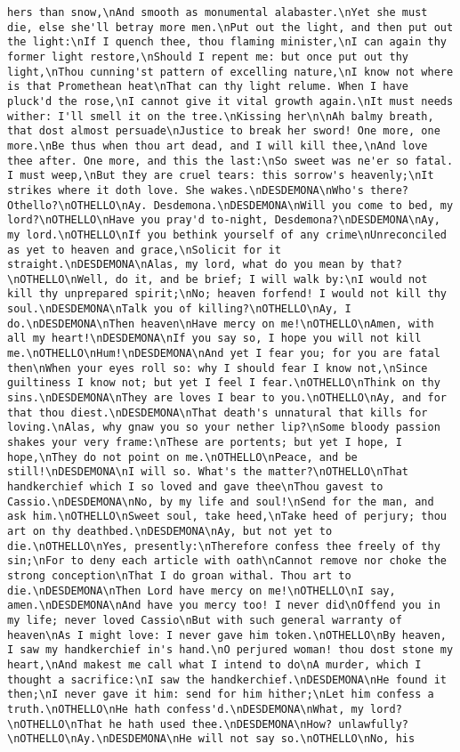 \begin{verbatim}
hers than snow,\nAnd smooth as monumental alabaster.\nYet she must die, else she'll betray more men.\nPut out the light, and then put out the light:\nIf I quench thee, thou flaming minister,\nI can again thy former light restore,\nShould I repent me: but once put out thy light,\nThou cunning'st pattern of excelling nature,\nI know not where is that Promethean heat\nThat can thy light relume. When I have pluck'd the rose,\nI cannot give it vital growth again.\nIt must needs wither: I'll smell it on the tree.\nKissing her\n\nAh balmy breath, that dost almost persuade\nJustice to break her sword! One more, one more.\nBe thus when thou art dead, and I will kill thee,\nAnd love thee after. One more, and this the last:\nSo sweet was ne'er so fatal. I must weep,\nBut they are cruel tears: this sorrow's heavenly;\nIt strikes where it doth love. She wakes.\nDESDEMONA\nWho's there? Othello?\nOTHELLO\nAy. Desdemona.\nDESDEMONA\nWill you come to bed, my lord?\nOTHELLO\nHave you pray'd to-night, Desdemona?\nDESDEMONA\nAy, my lord.\nOTHELLO\nIf you bethink yourself of any crime\nUnreconciled as yet to heaven and grace,\nSolicit for it straight.\nDESDEMONA\nAlas, my lord, what do you mean by that?\nOTHELLO\nWell, do it, and be brief; I will walk by:\nI would not kill thy unprepared spirit;\nNo; heaven forfend! I would not kill thy soul.\nDESDEMONA\nTalk you of killing?\nOTHELLO\nAy, I do.\nDESDEMONA\nThen heaven\nHave mercy on me!\nOTHELLO\nAmen, with all my heart!\nDESDEMONA\nIf you say so, I hope you will not kill me.\nOTHELLO\nHum!\nDESDEMONA\nAnd yet I fear you; for you are fatal then\nWhen your eyes roll so: why I should fear I know not,\nSince guiltiness I know not; but yet I feel I fear.\nOTHELLO\nThink on thy sins.\nDESDEMONA\nThey are loves I bear to you.\nOTHELLO\nAy, and for that thou diest.\nDESDEMONA\nThat death's unnatural that kills for loving.\nAlas, why gnaw you so your nether lip?\nSome bloody passion shakes your very frame:\nThese are portents; but yet I hope, I hope,\nThey do not point on me.\nOTHELLO\nPeace, and be still!\nDESDEMONA\nI will so. What's the matter?\nOTHELLO\nThat handkerchief which I so loved and gave thee\nThou gavest to Cassio.\nDESDEMONA\nNo, by my life and soul!\nSend for the man, and ask him.\nOTHELLO\nSweet soul, take heed,\nTake heed of perjury; thou art on thy deathbed.\nDESDEMONA\nAy, but not yet to die.\nOTHELLO\nYes, presently:\nTherefore confess thee freely of thy sin;\nFor to deny each article with oath\nCannot remove nor choke the strong conception\nThat I do groan withal. Thou art to die.\nDESDEMONA\nThen Lord have mercy on me!\nOTHELLO\nI say, amen.\nDESDEMONA\nAnd have you mercy too! I never did\nOffend you in my life; never loved Cassio\nBut with such general warranty of heaven\nAs I might love: I never gave him token.\nOTHELLO\nBy heaven, I saw my handkerchief in's hand.\nO perjured woman! thou dost stone my heart,\nAnd makest me call what I intend to do\nA murder, which I thought a sacrifice:\nI saw the handkerchief.\nDESDEMONA\nHe found it then;\nI never gave it him: send for him hither;\nLet him confess a truth.\nOTHELLO\nHe hath confess'd.\nDESDEMONA\nWhat, my lord?\nOTHELLO\nThat he hath used thee.\nDESDEMONA\nHow? unlawfully?\nOTHELLO\nAy.\nDESDEMONA\nHe will not say so.\nOTHELLO\nNo, his 
\end{verbatim}
